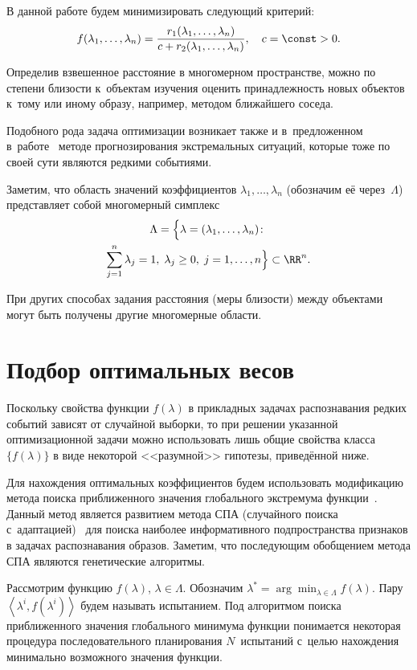 \documentclass[twoside]{article}
\begin{document}
В данной работе будем минимизировать следующий критерий:
$$f(\lambda_1,\ldots,\lambda_n)=\frac{r_1(\lambda_1,\ldots,\lambda_n)}
{c+r_2(\lambda_1,\ldots,\lambda_n)}, \quad c=\const>0.$$

Определив взвешенное расстояние в многомерном пространстве, можно по
степени близости к~объектам изучения оценить принадлежность новых
объектов к~тому или иному образу, например, методом ближайшего
соседа.

Подобного рода задача оптимизации возникает также и в~предложенном
в~работе~\cite{bibArticle1} методе прогнозирования экстремальных ситуаций, которые тоже
по своей сути являются редкими \mbox{событиями}.

\par
Заметим, что область значений коэффициентов $\lambda_1,\ldots,\lambda_n$ (обозначим её через~$\Lambda$)
представляет собой многомерный симплекс
\begin{multline*}
    \Lambda=
    \Bigl\{
        \lambda=(\lambda_1,\ldots,\lambda_n)
    \colon %
\\
        \sum_{j=1}^n \lambda_j =1,\; \lambda_j\geq 0,\; j=1,\ldots,n
    \Bigr\}
    \subset\RR^n.
\end{multline*}

При других способах задания расстояния (меры близости) между объектами могут быть получены
другие многомерные области.

\section{Подбор оптимальных весов}
Поскольку свойства функции $f(\lambda)$ в прикладных задачах распознавания редких событий
зависят от случайной выборки, то при решении указанной оптимизационной задачи
можно использовать лишь общие свойства класса $\{f(\lambda)\}$ в виде некоторой <<разумной>> гипотезы,
приведённой ниже.

Для нахождения оптимальных коэффициентов будем использовать
модификацию метода поиска приближенного значения глобального
экстремума функции~\cite{bibBook1, bibBook2}. Данный метод является
развитием метода СПА (случайного поиска с~адаптацией)~\cite{bibArticle2} для поиска наиболее
информативного подпространства признаков в задачах распознавания
образов. Заметим, что последующим обобщением метода СПА являются
генетические алгоритмы.

Рассмотрим функцию
$f(\lambda)$,\:  $\lambda\in\Lambda$.
Обозначим  $\lambda^*=\arg\min_{\lambda\in\Lambda}f(\lambda)$.   Пару
$\left\langle \lambda^{i},f(\lambda^{i} )\right \rangle$ будем называть  испытанием. Под алгоритмом
поиска приближенного значения глобального минимума функции понимается
некоторая процедура последовательного планирования $N$~испытаний
с~целью нахождения  минимально  возможного  значения  функции.
\end{document}
